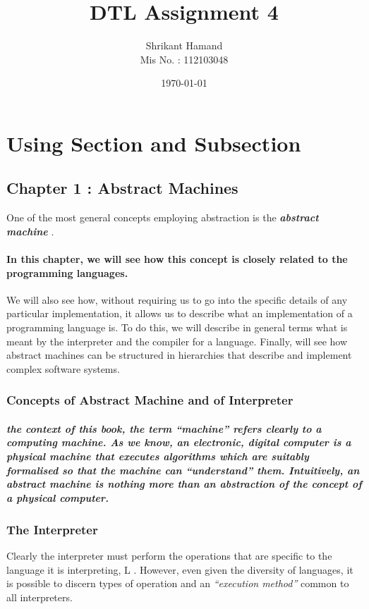 \documentclass[12pt]{article}
\author{\large Shrikant Hamand \\[12pt] Mis No. : 112103048}
\date{\today}
\begin{document}
\raggedright
\title{\huge \bf DTL Assignment 4}
\maketitle
{}
\newpage
\tableofcontents
\newpage
{}
\section{ Using Section and Subsection}
\vspace{5mm}
\subsection{Chapter 1 : Abstract Machines}
One of the most general concepts employing abstraction is the \textit{\textbf{abstract machine}} .
\paragraph{In this chapter, we will see how this concept is closely related to the programming languages.} We will also see how, without requiring us to go into the specific details of any particular implementation, it allows us to describe what an implementation
of a programming language is. To do this, we will describe in general terms what
is meant by the interpreter and the compiler for a language. Finally, will see how
abstract machines can be structured in hierarchies that describe and implement complex software systems.
\subsubsection{ Concepts of Abstract Machine and of Interpreter}
\subparagraph{ the context of this book, the term \textit{“machine”} refers clearly to a computing machine. As we know, an electronic, digital computer is a physical machine that executes algorithms which are suitably formalised so that the machine can \textit{“understand”} them. Intuitively, an abstract machine is nothing more than an abstraction of the concept of a physical computer.}
\subsubsection{The Interpreter}
Clearly the interpreter must perform the operations that are specific to the language it is interpreting, L . However, even given the diversity of languages, it is possible to discern types of operation and an \textit{“execution method”} common to all interpreters.
\end{document}
